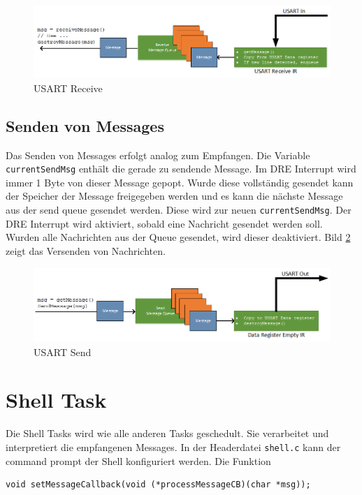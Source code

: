 \documentclass[fontsize=12pt, toc=bibliography, notitlepage]{scrreprt}
\begin{document}
\begin{figure}[H]
	\centering
	\includegraphics[width=450px]{images/UsartIn.png}
	\caption{USART Receive}
	\label{fig:usart_receive}
\end{figure}

\subsection{Senden von Messages}
Das Senden von Messages erfolgt analog zum Empfangen. Die Variable \lstinline$currentSendMsg$ enthält die gerade zu sendende Message. Im DRE Interrupt wird immer 1 Byte von dieser Message gepopt. Wurde diese vollständig gesendet kann der Speicher der Message freigegeben werden und es kann die nächste Message aus der send queue gesendet werden. Diese wird zur neuen \lstinline$currentSendMsg$. Der DRE Interrupt wird aktiviert, sobald eine Nachricht gesendet werden soll. Wurden alle Nachrichten aus der Queue gesendet, wird dieser deaktiviert. Bild \ref{fig:usart_send} zeigt das Versenden von Nachrichten.

\begin{figure}[H]
	\centering
	\includegraphics[width=450px]{images/UsartOut.png}
	\caption{USART Send}
	\label{fig:usart_send}
\end{figure}

\section{Shell Task}
\label{subsec:shell-task}
Die Shell Tasks wird wie alle anderen Tasks geschedult. Sie verarbeitet und interpretiert die empfangenen Messages. In der Headerdatei \lstinline$shell.c$ kann der command prompt der Shell konfiguriert werden. Die Funktion

\begin{lstlisting}
void setMessageCallback(void (*processMessageCB)(char *msg));
\end{lstlisting}
\end{document}
